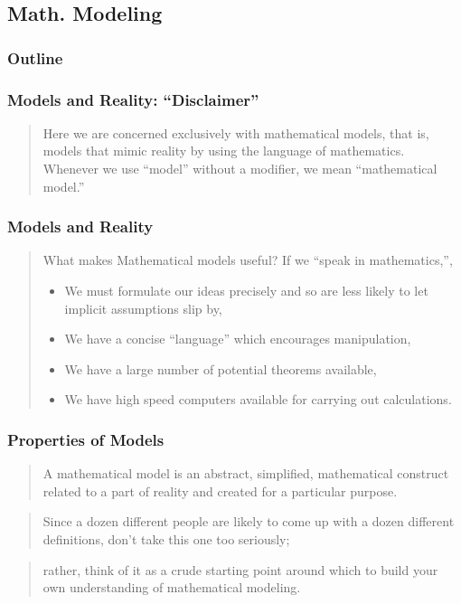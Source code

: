 \subsection{Math. Modeling}


\begin{frame}
    \frametitle{Outline}
\end{frame}

\begin{frame}
    \frametitle{Models and Reality: ``Disclaimer''}
    \begin{verse}
        Here we are concerned exclusively with mathematical models, that is,
        models that mimic reality by using the language of mathematics.
        Whenever we use ``model'' without a modifier, we mean ``mathematical
        model.''
    \end{verse}
\end{frame}

\begin{frame}
    \frametitle{Models and Reality}
    \begin{verse}
    What makes Mathematical models useful? 
    If we ``speak in mathematics,'', 
    \begin{itemize}
        \item We must formulate our ideas precisely and so are less likely to
            let implicit assumptions slip by,
        \item We have a concise ``language'' which encourages manipulation,
        \item We have a large number of potential theorems available,
        \item We have high speed computers available for carrying out calculations.
    \end{itemize}
    \end{verse}
\end{frame}

\begin{frame}
    \frametitle{Properties of Models}
    \begin{verse}
        A mathematical model is an abstract, simplified, mathematical
        construct related to a part of reality and created for a particular
        purpose.
    \end{verse} 
    \begin{verse} 
        Since a dozen different people are likely to come up with a
        dozen different definitions, don't take this one too seriously;
    \end{verse}
    \begin{verse}
        rather, think of it as a crude starting point around which to build
        your own understanding of mathematical modeling.
    \end{verse}
\end{frame}

